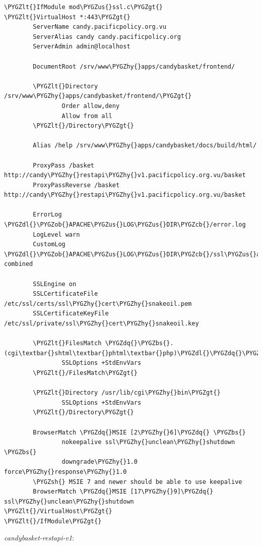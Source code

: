 \documentclass[letterpaper,10pt,english]{sphinxmanual}
\def\PYGZbs{\char`\\}
\def\PYGZus{\char`\_}
\def\PYGZob{\char`\{}
\def\PYGZcb{\char`\}}
\def\PYGZlt{\char`\<}
\def\PYGZgt{\char`\>}
\def\PYGZsh{\char`\#}
\def\PYGZdl{\char`\$}
\def\PYGZhy{\char`\-}
\def\PYGZdq{\char`\"}
\begin{document}
\begin{Verbatim}[commandchars=\\\{\}]
\PYGZlt{}IfModule mod\PYGZus{}ssl.c\PYGZgt{}
\PYGZlt{}VirtualHost *:443\PYGZgt{}
        ServerName candy.pacificpolicy.org.vu
        ServerAlias candy candy.pacificpolicy.org
        ServerAdmin admin@localhost

        DocumentRoot /srv/www\PYGZhy{}apps/candybasket/frontend/

        \PYGZlt{}Directory /srv/www\PYGZhy{}apps/candybasket/frontend/\PYGZgt{}
                Order allow,deny
                Allow from all
        \PYGZlt{}/Directory\PYGZgt{}

        Alias /help /srv/www\PYGZhy{}apps/candybasket/docs/build/html/

        ProxyPass /basket http://candy\PYGZhy{}restapi\PYGZhy{}v1.pacificpolicy.org.vu/basket
        ProxyPassReverse /basket http://candy\PYGZhy{}restapi\PYGZhy{}v1.pacificpolicy.org.vu/basket

        ErrorLog \PYGZdl{}\PYGZob{}APACHE\PYGZus{}LOG\PYGZus{}DIR\PYGZcb{}/error.log
        LogLevel warn
        CustomLog \PYGZdl{}\PYGZob{}APACHE\PYGZus{}LOG\PYGZus{}DIR\PYGZcb{}/ssl\PYGZus{}access.log combined

        SSLEngine on
        SSLCertificateFile    /etc/ssl/certs/ssl\PYGZhy{}cert\PYGZhy{}snakeoil.pem
        SSLCertificateKeyFile /etc/ssl/private/ssl\PYGZhy{}cert\PYGZhy{}snakeoil.key

        \PYGZlt{}FilesMatch \PYGZdq{}\PYGZbs{}.(cgi\textbar{}shtml\textbar{}phtml\textbar{}php)\PYGZdl{}\PYGZdq{}\PYGZgt{}
                SSLOptions +StdEnvVars
        \PYGZlt{}/FilesMatch\PYGZgt{}

        \PYGZlt{}Directory /usr/lib/cgi\PYGZhy{}bin\PYGZgt{}
                SSLOptions +StdEnvVars
        \PYGZlt{}/Directory\PYGZgt{}

        BrowserMatch \PYGZdq{}MSIE [2\PYGZhy{}6]\PYGZdq{} \PYGZbs{}
                nokeepalive ssl\PYGZhy{}unclean\PYGZhy{}shutdown \PYGZbs{}
                downgrade\PYGZhy{}1.0 force\PYGZhy{}response\PYGZhy{}1.0
        \PYGZsh{} MSIE 7 and newer should be able to use keepalive
        BrowserMatch \PYGZdq{}MSIE [17\PYGZhy{}9]\PYGZdq{} ssl\PYGZhy{}unclean\PYGZhy{}shutdown
\PYGZlt{}/VirtualHost\PYGZgt{}
\PYGZlt{}/IfModule\PYGZgt{}
\end{Verbatim}

\emph{candybasket-restapi-v1}:
\end{document}
